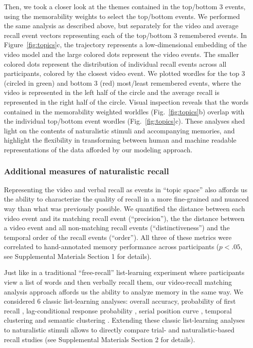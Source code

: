 \documentclass{article}
\begin{document}
Then, we took a closer look at the themes contained in the top/bottom 3 events, using the memorability weights to select the top/bottom events. We performed the same analysis as described above, but separately for the video and average recall event vectors representing each of the top/bottom 3 remembered events. In Figure~\ref{fig:topics}c, the trajectory represents a low-dimensional embedding of the video model and the large colored dots represent the video events. The smaller colored dots represent the distribution of individual recall events across all participants, colored by the closest video event. We plotted wordles for the top 3 (circled in green) and bottom 3 (red) most/least remembered events, where the video is represented in the left half of the circle and the average recall is represented in the right half of the circle. Visual inspection reveals that the words contained in the memorability weighted worldles (Fig.~\ref{fig:topics}b) overlap with the individual top/bottom event wordles (Fig.~\ref{fig:topics}c). These analyses shed light on the contents of naturalistic stimuli and accompanying memories, and highlight the flexibility in transforming between human and machine readable representations of the data afforded by our modeling approach.

\subsubsection{Additional measures of naturalistic recall}
Representing the video and verbal recall as events in ``topic space'' also affords us the ability to characterize the quality of recall in a more fine-grained and nuanced way than what was previously possible. We quantified the distance between each video event and its matching recall event (``precision''), the the distance between a video event and all non-matching recall events (``distinctiveness'') and the temporal order of the recall events (``order''). All three of these metrics were correlated to hand-annotated memory performance across participants ($p<.05$, see Supplemental Materials Section 1 for details).

Just like in a traditional ``free-recall'' list-learning experiment where participants view a list of words and then verbally recall them, our video-recall matching analysis approach affords us the ability to analyze memory in the same way. We considered 6 classic list-learning analyses: overall accuracy, probability of first recall \citep{Hoga75, HowaKaha99, Lami99}, lag-conditional response probability \citep{Kaha96, HowaKaha99}, serial position curve \citep{Murd62a}, temporal clustering and semantic clustering \citep{HowaKaha02, PolyEtal09}. Extending these classic list-learning analyses to naturalistic stimuli allows to directly compare trial- and naturalistic-based recall studies (see Supplemental Materials Section 2 for details).
\end{document}
